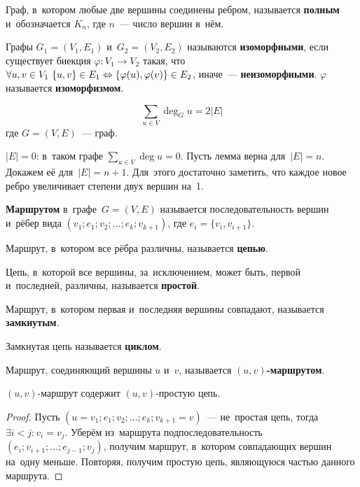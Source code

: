 Граф, в~котором любые две вершины соединены ребром, называется \textbf{полным} и~обозначается $K_n$, где $n$~--- число вершин в~нём.

Графы $G_1 = (V_1, E_1)$ и~$G_2 = (V_2, E_2)$ называются \textbf{изоморфными}, если существует биекция $\varphi \colon V_1 \to V_2$ такая, что
$\forall u, v \in V_1 \ \allowbreak \{ u, v \} \in E_1 \opbr\Leftrightarrow \{ \varphi(u), \varphi(v) \} \in E_2$, иначе~--- \textbf{неизоморфными}.
$\varphi$ называется \textbf{изоморфизмом}.

\begin{lemma}[о рукопожатиях]
\[ \sum_{u \in V} \deg_G u = 2|E| \]
где $G = (V, E)$~--- граф.
\end{lemma}
\begin{proofmathind}
	\indbase $|E| = 0$: в~таком графе $\displaystyle \sum_{u \in V} \deg u = 0$.
	\newpage
	\indstep Пусть лемма верна для~$|E| = n$.
	Докажем её для~$|E| = n + 1$.
	Для~этого достаточно заметить, что каждое новое ребро увеличивает степени двух вершин на~1. \indend
\end{proofmathind}

\textbf{Маршрутом} в~графе~$G = (V, E)$ называется последовательность вершин и~рёбер вида\newline
$(v_1; e_1; v_2; \ldots; e_k; v_{k+1})$, где $e_i = \{ v_i, v_{i+1} \}$.

Маршрут, в~котором все рёбра различны, называется \textbf{цепью}.

Цепь, в~которой все вершины, за~исключением, может быть, первой и~последней, различны, называется \textbf{простой}.

Маршрут, в~котором первая и~последняя вершины совпадают, называется \textbf{замкнутым}.

Замкнутая цепь называется \textbf{циклом}.

Маршрут, соединяющий вершины $u$ и~$v$, называется \textbf{$(u, v)$\nobreakdash-\hspace{0pt}маршрутом}.

\begin{lemma}
$(u, v)$\nobreakdash-\hspace{0pt}маршрут содержит $(u, v)$\nobreakdash-\hspace{0pt}простую цепь.
\end{lemma}
\begin{proof}
Пусть $(u = v_1; e_1; v_2; \ldots; e_k; v_{k+1} = v)$~--- не~простая цепь, тогда $\exists i < j \colon v_i = v_j$.
Уберём из~маршрута подпоследовательность $(e_i; v_{i+1}; \ldots; e_{j-1}; v_j)$, получим маршрут, в~котором совпадающих вершин на~одну меньше.
Повторяя, получим простую цепь, являющуюся частью данного маршрута.
\end{proof}

